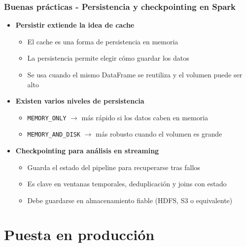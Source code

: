 \documentclass[aspectratio=169]{beamer}
\begin{document}
\begin{frame}\frametitle{Buenas prácticas - Persistencia y checkpointing en Spark}
\begin{itemize}
  \item \textbf{Persistir extiende la idea de cache}
  \begin{itemize}
    \item El cache es una forma de persistencia en memoria
    \item La persistencia permite elegir cómo guardar los datos
    \item Se usa cuando el mismo DataFrame se reutiliza y el volumen puede ser alto
  \end{itemize}

  \vspace{0.8em}

  \item \textbf{Existen varios niveles de persistencia}
  \begin{itemize}
    \item \texttt{MEMORY\_ONLY} $\rightarrow$ más rápido si los datos caben en memoria
    \item \texttt{MEMORY\_AND\_DISK} $\rightarrow$ más robusto cuando el volumen es grande
  \end{itemize}

  \vspace{0.8em}

  \item \textbf{Checkpointing para análisis en streaming}
  \begin{itemize}
    \item Guarda el estado del pipeline para recuperarse tras fallos
    \item Es clave en ventanas temporales, deduplicación y joins con estado
    \item Debe guardarse en almacenamiento fiable (HDFS, S3 o equivalente)
  \end{itemize}
\end{itemize}
\end{frame}




\section{Puesta en producción}
\end{document}
